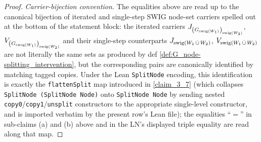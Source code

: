 \documentclass[main]{subfiles}
\begin{document}
\begin{proof}
\medskip\noindent\emph{Carrier-bijection convention.}
The equalities above are read up to the canonical bijection of iterated and single-step SWIG node-set carriers spelled out at the bottom of the statement block: the iterated carriers $J_{\left ( G_{\mathrm{swig}(W_1)} \right )_{\mathrm{swig}(W_2)}}$, $V_{\left ( G_{\mathrm{swig}(W_1)} \right )_{\mathrm{swig}(W_2)}}$ and their single-step counterparts $J_{\mathrm{swig}(W_1 \,\dot{\cup}\, W_2)}$, $V_{\mathrm{swig}(W_1 \,\dot{\cup}\, W_2)}$ are not literally the same sets as produced by def \ref{def:G_node-splitting_intervention}, but the corresponding pairs are canonically identified by matching tagged copies. Under the Lean \texttt{SplitNode} encoding, this identification is exactly the \texttt{flattenSplit} map introduced in \ref{claim_3_7} (which collapses \texttt{SplitNode (SplitNode Node)} onto \texttt{SplitNode Node} by sending nested \texttt{copy0}/\texttt{copy1}/\texttt{unsplit} constructors to the appropriate single-level constructor, and is imported verbatim by the present row's Lean file); the equalities ``$=$'' in sub-claims (a) and (b) above and in the LN's displayed triple equality are read along that map.
\end{proof}
\end{document}
